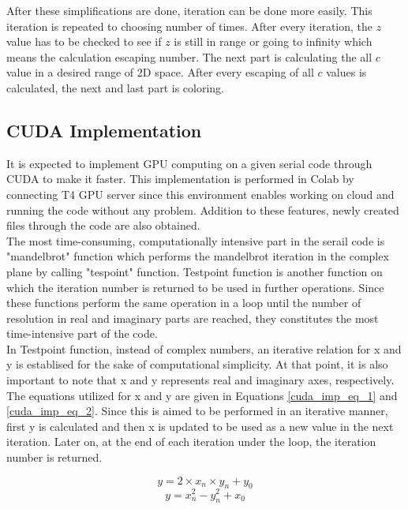 \documentclass{article}
\begin{document}
After these simplifications are done, iteration can be done more easily. This iteration is repeated to choosing number of times. After every iteration, the \(z\) value has to be checked to see if \(z\) is still in range or going to infinity which means the calculation escaping number.  The next part is calculating the all \(c\) value in a desired range of 2D space. After every escaping of all \(c\) values is calculated, the next and last part is coloring. 
\clearpage 
\subsection{CUDA Implementation}
It is expected to implement GPU computing on a given serial code through CUDA to make it faster. This implementation is performed in Colab by connecting T4 GPU server since this environment enables working on cloud and running the code without any problem. Addition to these features, newly created files through the code are also obtained. \\

The most time-consuming, computationally intensive part in the serail code is "mandelbrot" function which performs the mandelbrot iteration in the complex plane by calling "tespoint" function. Testpoint function is another function on which the iteration number is returned to be used in further operations. Since these functions perform the same operation in a loop until the number of resolution in real and imaginary parts are reached, they constitutes the most time-intensive part of the code. \\

In Testpoint function, instead of complex numbers, an iterative relation for x and y is establised for the sake of computational simplicity. At that point, it is also important to note that x and y represents real and imaginary axes, respectively. The equations utilized for x and y are given in Equations \ref{cuda_imp_eq_1} and \ref{cuda_imp_eq_2}. Since this is aimed to be performed in an iterative manner, first y is calculated and then x is updated to be used as a new value in the next iteration. Later on, at the end of each iteration under the loop, the iteration number is returned. 

\begin{equation}  
    y = 2\times x_n \times y_n + y_0
    \label{cuda_imp_eq_1}
\end{equation}
\begin{equation}  
    y = x_n^2 - y_n^2 + x_0 
    \label{cuda_imp_eq_2}
\end{equation}
\end{document}
